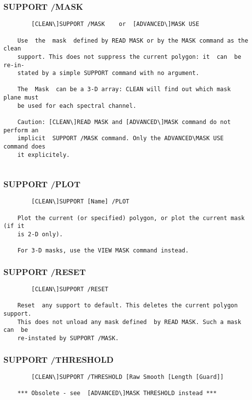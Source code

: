 \subsubsection{SUPPORT /MASK}
\begin{verbatim}
        [CLEAN\]SUPPORT /MASK    or  [ADVANCED\]MASK USE

    Use  the  mask  defined by READ MASK or by the MASK command as the clean
    support. This does not suppress the current polygon: it  can  be  re-in-
    stated by a simple SUPPORT command with no argument.

    The  Mask  can be a 3-D array: CLEAN will find out which mask plane must
    be used for each spectral channel.

    Caution: [CLEAN\]READ MASK and [ADVANCED\]MASK command do not perform an
    implicit  SUPPORT /MASK command. Only the ADVANCED\MASK USE command does
    it explicitely.


\end{verbatim}
\subsubsection{SUPPORT /PLOT}
\begin{verbatim}
        [CLEAN\]SUPPORT [Name] /PLOT

    Plot the current (or specified) polygon, or plot the current mask (if it
    is 2-D only).

    For 3-D masks, use the VIEW MASK command instead.

\end{verbatim}
\subsubsection{SUPPORT /RESET}
\begin{verbatim}
        [CLEAN\]SUPPORT /RESET

    Reset  any support to default. This deletes the current polygon support.
    This does not unload any mask defined  by READ MASK. Such a mask can  be
    re-instated by SUPPORT /MASK.

\end{verbatim}
\subsubsection{SUPPORT /THRESHOLD}
\begin{verbatim}
        [CLEAN\]SUPPORT /THRESHOLD [Raw Smooth [Length [Guard]]

    *** Obsolete - see  [ADVANCED\]MASK THRESHOLD instead ***

\end{verbatim}
